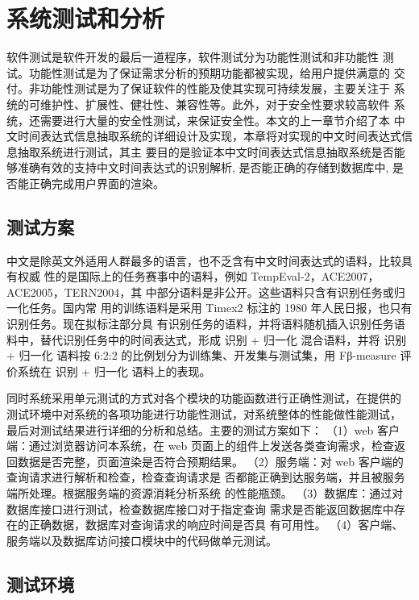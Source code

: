 
\chapter{系统测试和分析}

软件测试是软件开发的最后一道程序，软件测试分为功能性测试和非功能性
测试。功能性测试是为了保证需求分析的预期功能都被实现，给用户提供满意的
交付。非功能性测试是为了保证软件的性能及使其实现可持续发展，主要关注于
系统的可维护性、扩展性、健壮性、兼容性等。此外，对于安全性要求较高软件
系统，还需要进行大量的安全性测试，来保证安全性。本文的上一章节介绍了本
中文时间表达式信息抽取系统的详细设计及实现，本章将对实现的中文时间表达式信息抽取系统进行测试，其主
要目的是验证本中文时间表达式信息抽取系统是否能够准确有效的支持中文时间表达式的识别解析, 是否能正确的存储到数据库中, 是否能正确完成用户界面的渲染。

\section{测试方案}

中文是除英文外适用人群最多的语言，也不乏含有中文时间表达式的语料，比较具有权威
性的是国际上的任务赛事中的语料，例如 TempEval-2，ACE2007，ACE2005，TERN2004，其
中部分语料是非公开。这些语料只含有识别任务或归一化任务。国内常
用的训练语料是采用 Timex2 标注的 1980 年人民日报，也只有识别任务。现在拟标注部分具
有识别任务的语料，并将语料随机插入识别任务语料中，替代识别任务中的时间表达式，形成 识别 +
归一化 混合语料，并将 识别 + 归一化 语料按 6:2:2 的比例划分为训练集、开发集与测试集，用 Fβ-measure
评价系统在 识别 + 归一化 语料上的表现。

同时系统采用单元测试的方式对各个模块的功能函数进行正确性测试，在提供的
测试环境中对系统的各项功能进行功能性测试，对系统整体的性能做性能测试，
最后对测试结果进行详细的分析和总结。主要的测试方案如下：
（1）web 客户端：通过浏览器访问本系统，在 web 页面上的组件上发送各类查询需求，检查返回数据是否完整，页面渲染是否符合预期结果。
（2）服务端：对 web 客户端的查询请求进行解析和检查，检查查询请求是
否都能正确到达服务端，并且被服务端所处理。根据服务端的资源消耗分析系统
的性能瓶颈。
（3）数据库：通过对数据库接口进行测试，检查数据库接口对于指定查询
需求是否能返回数据库中存在的正确数据，数据库对查询请求的响应时间是否具
有可用性。
（4）客户端、服务端以及数据库访问接口模块中的代码做单元测试。

\section{测试环境}

